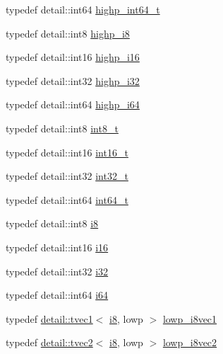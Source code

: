 \begin{DoxyCompactItemize}
\item 
typedef detail\-::int64 \hyperlink{group__gtc__type__precision_ga0f5186bde44471133b08057cae8a51ac}{highp\-\_\-int64\-\_\-t}
\item 
typedef detail\-::int8 \hyperlink{group__gtc__type__precision_ga8b9eb0b24cce7f14478bfcacb53ce839}{highp\-\_\-i8}
\item 
typedef detail\-::int16 \hyperlink{group__gtc__type__precision_gaa04399853952dbce29cb62e2432f350a}{highp\-\_\-i16}
\item 
typedef detail\-::int32 \hyperlink{group__gtc__type__precision_ga197d19b585222da57d70238a5cfc2be8}{highp\-\_\-i32}
\item 
typedef detail\-::int64 \hyperlink{group__gtc__type__precision_gad3cb9a0ac0266ea2c51c6fac256345d1}{highp\-\_\-i64}
\item 
typedef detail\-::int8 \hyperlink{group__gtc__type__precision_ga673898d450b2a91186f3c4f40c5f8633}{int8\-\_\-t}
\item 
typedef detail\-::int16 \hyperlink{group__gtc__type__precision_gaf89ee61e0d34aa4a462104b7ae7f2da6}{int16\-\_\-t}
\item 
typedef detail\-::int32 \hyperlink{group__gtc__type__precision_gab870c0eb6f525b0c8c4716762e0fc3a8}{int32\-\_\-t}
\item 
typedef detail\-::int64 \hyperlink{group__gtc__type__precision_ga6abb23fbf4e39c50ec5341160b5da5ab}{int64\-\_\-t}
\item 
typedef detail\-::int8 \hyperlink{group__gtc__type__precision_gaae064be68b7d36cd7910c16e8ad18bba}{i8}
\item 
typedef detail\-::int16 \hyperlink{group__gtc__type__precision_ga35e5542ca05b29cc256fdafb8503d1fd}{i16}
\item 
typedef detail\-::int32 \hyperlink{group__gtc__type__precision_ga1d8ed5c43e91ea7d4528389da4fa9524}{i32}
\item 
typedef detail\-::int64 \hyperlink{group__gtc__type__precision_gac7a7eaad46064fc952b06df33689da23}{i64}
\item 
typedef \hyperlink{structglm_1_1detail_1_1tvec1}{detail\-::tvec1}$<$ \hyperlink{group__gtc__type__precision_gaae064be68b7d36cd7910c16e8ad18bba}{i8}, lowp $>$ \hyperlink{group__gtc__type__precision_ga490ff77964d0386c1db936eb2a324988}{lowp\-\_\-i8vec1}
\item 
typedef \hyperlink{structglm_1_1detail_1_1tvec2}{detail\-::tvec2}$<$ \hyperlink{group__gtc__type__precision_gaae064be68b7d36cd7910c16e8ad18bba}{i8}, lowp $>$ \hyperlink{group__gtc__type__precision_ga511280c8869c7c79bba3c359f37f5559}{lowp\-\_\-i8vec2}

\end{DoxyCompactItemize}
